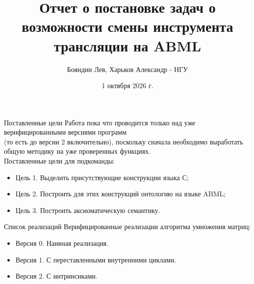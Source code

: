 \documentclass[aspectratio=169, 11pt]{beamer}
\title[Отчет о постановке задач]{Отчет о постановке задач о \\ возможности смены инструмента трансляции на ABML}
\author[Бояндин Лев, Харьков Александр - НГУ]{Бояндин Лев, Харьков Александр - НГУ}
\date{\small{1 октября 2026 г.}}
\begin{document}
\begin{frame}[plain]
	\titlepage
\end{frame}


\begin{frame}{Поставленные цели}
	Работа пока что проводится только над уже верифицированными версиями программ \\
	(то есть до версии 2 включительно), поскольку сначала необходимо выработать \\
	общую методику на уже проверенных функциях. \\
	\vspace{2em}
	Поставленные цели для подкоманды:
	\begin{itemize}
		\item Цель 1. Выделить присутствующие конструкции языка С;
		\item Цель 2. Построить для этих конструкций онтологию на языке ABML;
		\item Цель 3. Построить аксиоматическую семантику.
	\end{itemize}
\end{frame}


\begin{frame}{Список реализаций}
    Верифицированные реализации алгоритма умножения матриц:
    \vspace{1em}
    \begin{itemize}
        \item Версия 0. Наивная реализация.
        \item Версия 1. С переставленными внутренними циклами.
        \item Версия 2. С интринсиками.
    \end{itemize}
\end{frame}
\end{document}
